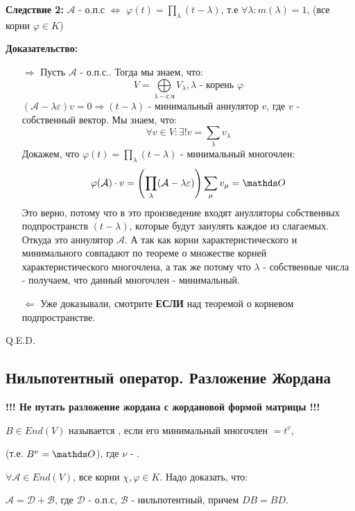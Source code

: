 \textbf{Следствие 2:} $\mathcal{A}$ - о.п.с $\Leftrightarrow$ $\varphi(t) = \prod\limits_{\lambda}(t-\lambda)$, т.е $\forall \lambda: m(\lambda) =1$, (все корни $\varphi \in K$)

\textbf{Доказательство:}
\begin{enumerate}
    \item[$\Rightarrow$] Пусть $\mathcal{A}$ - о.п.с.. Тогда мы знаем, что:
    $$V = \bigoplus\limits_{\lambda - \text{с.ч}}V_\lambda, \lambda \text{ - корень } \varphi$$
    $(\mathcal{A}-\lambda \varepsilon)v = 0 \Rightarrow (t-\lambda)$ - минимальный аннулятор $v$, где $v$ - собственный вектор. Мы знаем, что:
    $$\forall v \in V: \exists! v=\sum\limits_{\lambda}v_{\lambda}$$
    Докажем, что  $\varphi(t) = \prod\limits_{\lambda}(t-\lambda)$ - минимальный многочлен:
    $$\varphi(\mathcal{A})\cdot v =\left(\prod\limits_{\lambda}(\mathcal{A}-\lambda \varepsilon)\right)\sum\limits_{\mu}v_{\mu}  = \zero$$
    Это верно, потому что в это произведение входят анулляторы собственных подпространств $(t-\lambda)$, которые будут занулять каждое из слагаемых. Откуда это аннулятор $\mathcal{A}$. А так как корни характеристического и минимального совпадают по  теореме о множестве корней характеристического многочлена, а так же потому что $\lambda$ - собственные числа - получаем, что данный многочлен - минимальный.
    
    \item[$\Leftarrow$] Уже доказывали, смотрите \textbf{ЕСЛИ} над теоремой о корневом подпространстве.
\end{enumerate}
 \hfill Q.E.D.




\pagebreak


\subsection{Нильпотентный оператор. Разложение Жордана }

\textbf{!!! Не путать разложение жордана с жордановой формой матрицы !!!}

 $B \in End(V)$ называется , если его минимальный многочлен $ = t^v$,

(т.е. $B^\nu = \zero$), где $\nu$ - .



$\forall \mathcal{A}\in End(V)$, все корни $\chi,\varphi \in K$. Надо доказать, что:

$\mathcal{A} = \mathcal{D} +\mathcal{B} $, где $\mathcal{D}$ - о.п.с, $\mathcal{B}$ - нильпотентный, причем $DB =BD$.

